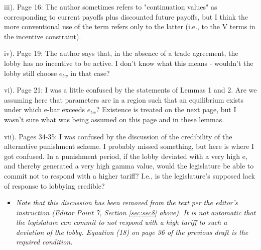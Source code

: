 \documentclass[12pt]{article}
\begin{document}
iii). Page 16: The author sometimes refers to "continuation values" as corresponding to current payoffs plus discounted future payoffs, but I think the more conventional use of the term refers only to the latter (i.e., to the V terms in the incentive constraint).

iv). Page 19: The author says that, in the absence of a trade agreement, the lobby has no incentive to be active. I don't know what this means - wouldn't the lobby still choose $e_{tw}$ in that case?

vi). Page 21: I was a little confused by the statements of Lemmas 1 and 2. Are we assuming here that parameters are in a region such that an equilibrium exists under which e-bar exceeds $e_{tw}$? Existence is treated on the next page, but I wasn't sure what was being assumed on this page and in these lemmas.

vii). Pages 34-35: I was confused by the discussion of the credibility of the alternative punishment scheme. I probably missed something, but here is where I got confused. In a punishment period, if the lobby deviated with a very high e, and thereby generated a very high gamma value, would the legislature be able to commit not to respond with a higher tariff? I.e., is the legislature's supposed lack of response to lobbying credible?
\begin{itemize}
	\item \textit{Note that this discussion has been removed from the text per the editor's instruction (Editor Point 7, Section \ref{sec:sec8} above). It is not automatic that the legislature can commit to not respond with a high tariff to such a deviation of the lobby. Equation (18) on page 36 of the previous draft is the required condition.}
\end{itemize}
\end{document}
